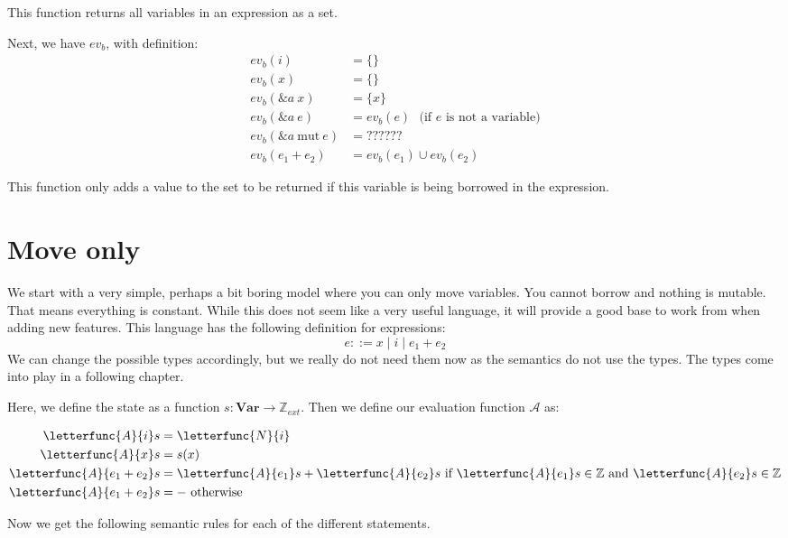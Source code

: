 This function returns all variables in an expression as a set.

Next, we have $ev_b$, with definition:
\begin{align*}
    ev_b(i)          &= \{\}
\\  ev_b(x)          &= \{\}
\\  ev_b(\&a~x)          &= \{x\}
\\  ev_b(\&a~e)          &= ev_b(e) ~~~\textrm{(if $e$ is not a variable)}
\\  ev_b(\&a~\textrm{mut}~e)          &= ??????
\\  ev_b(e_1 + e_2)          &= ev_b(e_1) \cup ev_b(e_2)
\end{align*}

This function only adds a value to the set to be returned if this variable is being borrowed in the expression. 

\section{Move only}
We start with a very simple, perhaps a bit boring model where you can only move variables. You cannot borrow and nothing is mutable. That means everything is constant. While this does not seem like a very useful language, it will provide a good base to work from when adding new features. This language has the following definition for expressions:
$$e ::= x \mid i \mid e_1 + e_2$$
We can change the possible types accordingly, but we really do not need them now as the semantics do not use the types. The types come into play in a following chapter. 

Here, we define the state as a function $s: \textbf{Var} \to \mathbb{Z}_{ext}$. Then we define our evaluation function $\mathcal{A}$ as:

\begin{align*}
    \letterfunc{A}{i}s          &= \letterfunc{N}{i}
\\  \letterfunc{A}{x}s          &= s(x)
\\  \letterfunc{A}{e_1 + e_2}s  &= \letterfunc{A}{e_1}s + \letterfunc{A}{e_2}s \textrm{ if } \letterfunc{A}{e_1}s \in \mathbb{Z} \textrm{ and } \letterfunc{A}{e_2}s \in \mathbb{Z}
\\  \letterfunc{A}{e_1 + e_2}s  &= - \textrm{ otherwise}
\end{align*}

Now we get the following semantic rules for each of the different statements. 

